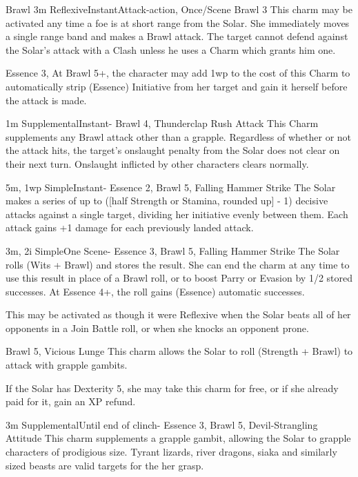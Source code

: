 \begin{Ability}{Brawl}
  {3m}
  {Reflexive}{Instant}{Attack-action, Once/Scene}
  {Brawl 3}
  This charm may be activated any time a foe is at short range from the Solar. She immediately moves a single range band and makes a Brawl attack. The target cannot defend against the Solar's attack with a Clash unless he uses a Charm which grants him one.

Essence 3,   At Brawl 5+, the character may add 1wp to the cost of this Charm to automatically strip (Essence) Initiative from her target and gain it herself before the attack is made.

  {1m}
  {Supplemental}{Instant}{-}
  {Brawl 4, Thunderclap Rush Attack}
  This Charm supplements any Brawl attack other than a grapple. Regardless of whether or not the attack hits, the target's onslaught penalty from the Solar does not clear on their next turn. Onslaught inflicted by other characters clears normally.

  {5m, 1wp}
  {Simple}{Instant}{-}
  {Essence 2, Brawl 5, Falling Hammer Strike}
  The Solar makes a series of up to ([half Strength or Stamina, rounded up] - 1) decisive attacks against a single target, dividing her initiative evenly between them. Each attack gains +1 damage for each previously landed attack.

  {3m, 2i}
  {Simple}{One Scene}{-}
  {Essence 3, Brawl 5, Falling Hammer Strike}
  The Solar rolls (Wits + Brawl) and stores the result. She can end the charm at any time to use this result in place of a Brawl roll, or to boost Parry or Evasion by 1/2 stored successes. At Essence 4+, the roll gains (Essence) automatic successes.

  This may be activated as though it were Reflexive when the Solar beats all of her opponents in a Join Battle roll, or when she knocks an opponent prone.

  {Brawl 5, Vicious Lunge}
  This charm allows the Solar to roll (Strength + Brawl) to attack with grapple gambits.

  If the Solar has Dexterity 5, she may take this charm for free, or if she already paid for it, gain an XP refund.

  {3m}
  {Supplemental}{Until end of clinch}{-}
  {Essence 3, Brawl 5, Devil-Strangling Attitude}
  This charm supplements a grapple gambit, allowing the Solar to grapple characters of prodigious size. Tyrant lizards, river dragons, siaka and similarly sized beasts are valid targets for the her grasp.


\end{Ability}
